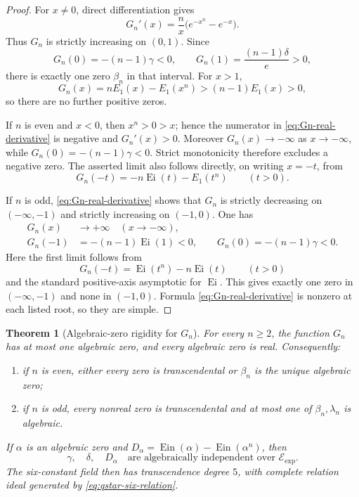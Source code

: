 \documentclass[11pt]{article}
\newtheorem{theorem}{Theorem}[section]
\theoremstyle{definition}
\theoremstyle{remark}
\newcommand{\Ein}{\operatorname{Ein}}
\newcommand{\Ei}{\operatorname{Ei}}
\newcommand{\Eexp}{\mathcal E_{\mathrm{exp}}}
\begin{document}
\begin{proof}
For \(x\ne0\), direct differentiation gives
\begin{equation}\label{eq:Gn-real-derivative}
 G_n'(x)=\frac n{x}\bigl(e^{-x^n}-e^{-x}\bigr).
\end{equation}
Thus \(G_n\) is strictly increasing on \((0,1)\).  Since
\[
 G_n(0)=-(n-1)\gamma<0,
 \qquad
 G_n(1)=\frac{(n-1)\delta}{e}>0,
\]
there is exactly one zero \(\beta_n\) in that interval.  For \(x>1\),
\[
 G_n(x)=nE_1(x)-E_1(x^n)>(n-1)E_1(x)>0,
\]
so there are no further positive zeros.

If \(n\) is even and \(x<0\), then \(x^n>0>x\); hence the numerator in
\eqref{eq:Gn-real-derivative} is negative and \(G_n'(x)>0\).  Moreover
\(G_n(x)\to-\infty\) as \(x\to-\infty\), while
\(G_n(0)=-(n-1)\gamma<0\).  Strict monotonicity therefore excludes a
negative zero.  The asserted limit also follows directly, on writing
\(x=-t\), from
\[
 G_n(-t)=-n\Ei(t)-E_1(t^n)\qquad(t>0).
\]

If \(n\) is odd, \eqref{eq:Gn-real-derivative} shows that \(G_n\) is
strictly decreasing on \((-\infty,-1)\) and strictly increasing on
\((-1,0)\).  One has
 \begin{align*}
 G_n(x)&\longrightarrow+\infty\quad(x\to-\infty),\\
 G_n(-1)&=-(n-1)\Ei(1)<0,\qquad
 G_n(0)=-(n-1)\gamma<0.
 \end{align*}
Here the first limit follows from
\[
 G_n(-t)=\Ei(t^n)-n\Ei(t)\qquad(t>0)
\]
and the standard positive-axis asymptotic for \(\Ei\).
This gives exactly one zero in \((-\infty,-1)\) and none in \((-1,0)\).
Formula \eqref{eq:Gn-real-derivative} is nonzero at each listed root, so
they are simple.
\end{proof}

\begin{theorem}[Algebraic-zero rigidity for \(G_n\)]
\label{thm:Gn-algebraic-zero-rigidity}
For every \(n\ge2\), the function \(G_n\) has at most one algebraic zero,
and every algebraic zero is real.  Consequently:
\begin{enumerate}[label=\textup{(\roman*)}]
 \item if \(n\) is even, either every zero is transcendental or
       \(\beta_n\) is the unique algebraic zero;
 \item if \(n\) is odd, every nonreal zero is transcendental and at most
       one of \(\beta_n,\lambda_n\) is algebraic.
\end{enumerate}
If \(\alpha\) is an algebraic zero and
\(D_\alpha=\Ein(\alpha)-\Ein(\alpha^n)\), then
\begin{equation}\label{eq:Gn-witness-amplification}
 \gamma,\quad\delta,\quad D_\alpha
 \quad\text{are algebraically independent over }\Eexp.
\end{equation}
The six-constant field then has transcendence degree \(5\), with complete
relation ideal generated by \eqref{eq:qstar-six-relation}.
\end{theorem}
\end{document}
